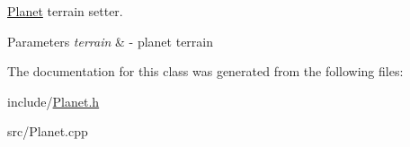 \hyperlink{class_planet}{Planet} terrain setter. 


\begin{DoxyParams}{Parameters}
{\em terrain} & -\/ planet terrain \\
\hline
\end{DoxyParams}


The documentation for this class was generated from the following files\+:\begin{DoxyCompactItemize}
\item 
include/\hyperlink{_planet_8h}{Planet.\+h}\item 
src/Planet.\+cpp\end{DoxyCompactItemize}
